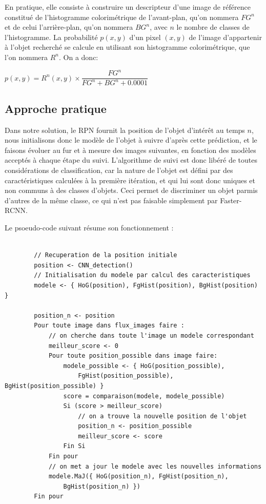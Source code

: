         En pratique, elle consiste à construire un descripteur d'une image de référence constitué de l'histogramme colorimétrique de l'avant-plan, qu'on nommera $FG^{n}$ et de celui l'arrière-plan, qu'on nommera $BG^{n}$, avec $n$ le nombre de classes de l'histogramme. 
        La probabilité $p(x,y)$ d'un pixel $(x,y)$ de l'image d'appartenir à l'objet recherché se calcule en utilisant son histogramme colorimétrique, que l'on nommera $R^{n}$.
		On a donc: 
        \begin{center}
          $ p(x,y) = R^{n}(x,y) \times \dfrac{FG^{n}}{FG^{n}+BG^{n}+0.0001}$
        \end{center}

        \subsection{Approche pratique}
        Dans notre solution, le RPN fournit la position de l'objet d'intérêt au temps $n$, nous initialisons donc le modèle de l'objet à suivre d'après cette prédiction, et le faisons évoluer au fur et à mesure des images suivantes, en fonction des modèles acceptés à chaque étape du suivi.
        L'algorithme de suivi est donc libéré de toutes considérations de classification, car la nature de l'objet est défini par des caractéristiques calculées à la première itération, et qui lui sont donc uniques et non communs à des classes d'objets. Ceci permet de discriminer un objet parmis d'autres de la même classe, ce qui n'est pas faisable simplement par Faster-RCNN.
        
		Le psoeudo-code suivant résume son fonctionnement :
	
		\begin{lstlisting}
		
		// Recuperation de la position initiale
		position <- CNN_detection()
		// Initialisation du modele par calcul des caracteristiques
		modele <- { HoG(position), FgHist(position), BgHist(position) }
		
		position_n <- position
		Pour toute image dans flux_images faire : 
			// on cherche dans toute l'image un modele correspondant
			meilleur_score <- 0
			Pour toute position_possible dans image faire:
				modele_possible <- { HoG(position_possible), 
					FgHist(position_possible), BgHist(position_possible) }
				score = comparaison(modele, modele_possible)
				Si (score > meilleur_score)
					// on a trouve la nouvelle position de l'objet
					position_n <- position_possible
					meilleur_score <- score
				Fin Si
			Fin pour
			// on met a jour le modele avec les nouvelles informations
			modele.MaJ({ HoG(position_n), FgHist(position_n), 
				BgHist(position_n) })
		Fin pour
		
		\end{lstlisting}
		
